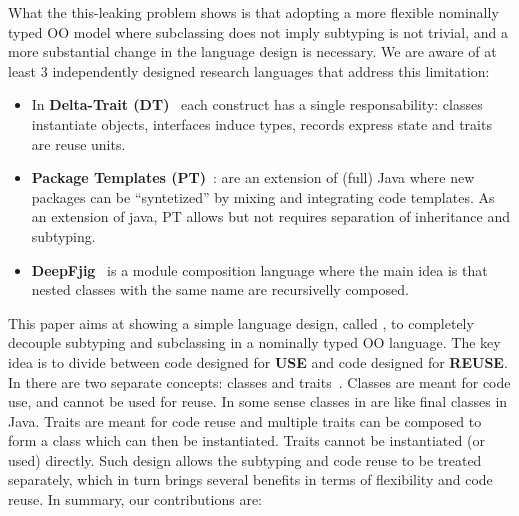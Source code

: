 What the this-leaking problem shows is that adopting a more flexible
nominally typed OO model where subclassing does not imply subtyping is
not trivial, and a more substantial change in the language design is
necessary.  We are aware of at least 3 independently designed research
languages that address this limitation:
\begin{itemize}
\item In {\bf Delta-Trait (DT)}~\cite{Bettini:2010:ISP:1774088.1774530,BETTINI2013521,Bettini2015282}
each  construct has a single responsability: classes instantiate objects,
interfaces induce types, records express state and traits are reuse units.
\item {\bf Package Templates (PT)}~\cite{KrogdahlMS09,DBLP:journals/taosd/AxelsenSKM12,DBLP:conf/gpce/AxelsenK12}:
are an extension of (full) Java where new packages can be ``syntetized'' by mixing
and integrating code templates. As an extension of java, PT allows but not requires
separation of inheritance and subtyping.
\item {\bf
    DeepFjig}~\cite{deep,servetto2014meta,DBLP:journals/iandc/LagorioSZ12} is
a module composition language where the main idea is that
nested classes with the same name are recursivelly composed.
\end{itemize}
This paper aims at showing a simple language design, called \name, to
completely decouple subtyping and subclassing in a nominally typed OO
language. The key idea is to divide between code designed for
\textbf{USE} and code designed for \textbf{REUSE}. 
In \name there are two separate concepts: classes
and traits~\cite{Traits:ECOOP2003}. Classes are meant for code use, and cannot be used
for reuse. In some sense classes in \name are like final classes in
Java. Traits are meant for code reuse and multiple traits can be
composed to form a class which can then be instantiated. Traits 
cannot be instantiated (or used) directly. Such design allows the
subtyping and code reuse to be treated separately, which in turn
brings several benefits in terms of flexibility and code reuse.
In summary, our contributions are:



